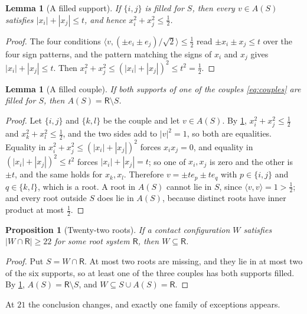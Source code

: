 \documentclass[11pt,reqno]{amsart}
\renewcommand{\_}{\origunderscore\allowbreak}
\numberwithin{equation}{section}
\theoremstyle{plain}
\newtheorem{prop}[thm]{Proposition}
\newtheorem{lem}[thm]{Lemma}
\theoremstyle{definition}
\theoremstyle{remark}
\newcommand{\Rt}{\mathsf{R}}                 %
\begin{document}
\begin{lem}[A filled support]\label{lem:filled-support}
If $\{i,j\}$ is filled for $S$, then every $v\in A(S)$ satisfies
$|x_i|+|x_j|\le t$, and hence $x_i^2+x_j^2\le\tfrac12$.
\end{lem}

\begin{proof}
The four conditions $\langle v,(\pm e_i\pm e_j)/\sqrt2\rangle\le\tfrac12$
read $\pm x_i\pm x_j\le t$ over the four sign patterns, and the pattern
matching the signs of $x_i$ and $x_j$ gives $|x_i|+|x_j|\le t$. Then
$x_i^2+x_j^2\le(|x_i|+|x_j|)^2\le t^2=\tfrac12$.
\end{proof}

\begin{lem}[A filled couple]\label{lem:filled-couple}
If both supports of one of the couples \eqref{eq:couples} are filled for
$S$, then $A(S)=\Rt\setminus S$.
\end{lem}

\begin{proof}
Let $\{i,j\}$ and $\{k,l\}$ be the couple and let $v\in A(S)$. By
\cref{lem:filled-support}, $x_i^2+x_j^2\le\tfrac12$ and
$x_k^2+x_l^2\le\tfrac12$, and the two sides add to $|v|^2=1$, so both are
equalities. Equality in $x_i^2+x_j^2\le(|x_i|+|x_j|)^2$ forces
$x_ix_j=0$, and equality in $(|x_i|+|x_j|)^2\le t^2$ forces
$|x_i|+|x_j|=t$; so one of $x_i,x_j$ is zero and the other is $\pm t$,
and the same holds for $x_k,x_l$. Therefore $v=\pm te_p\pm te_q$ with
$p\in\{i,j\}$ and $q\in\{k,l\}$, which is a root. A root in $A(S)$ cannot
lie in $S$, since $\langle v,v\rangle=1>\tfrac12$; and every root outside
$S$ does lie in $A(S)$, because distinct roots have inner product at most
$\tfrac12$.
\end{proof}

\begin{prop}[Twenty-two roots]\label{prop:meet22}
If a contact configuration $W$ satisfies $|W\cap\Rt|\ge22$ for some root
system $\Rt$, then $W\subseteq\Rt$.
\end{prop}

\begin{proof}
Put $S=W\cap\Rt$. At most two roots are missing, and they lie in at most
two of the six supports, so at least one of the three couples has both
supports filled. By \cref{lem:filled-couple}, $A(S)=\Rt\setminus S$, and
$W\subseteq S\cup A(S)=\Rt$.
\end{proof}

At $21$ the conclusion changes, and exactly one family of exceptions
appears.
\end{document}
